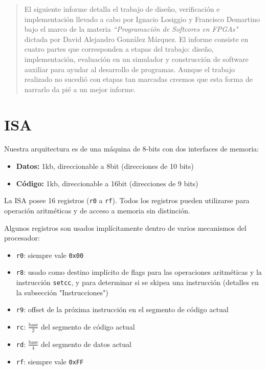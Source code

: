 \documentclass{article}
\begin{document}

\fecha{\today}



\maketitle

\begin{abstract}
El siguiente informe detalla el trabajo de diseño, verificación e implementación llevado a cabo por Ignacio Losiggio y Francisco Demartino bajo el marco de la materia \emph{``Programación de Softcores en FPGAs"} dictada por David Alejandro González Márquez. El informe consiste en cuatro partes que corresponden a etapas del trabajo: diseño, implementación, evaluación en un simulador y construcción de software auxiliar para ayudar al desarrollo de programas. Aunque el trabajo realizado no sucedió con etapas tan marcadas creemos que esta forma de narrarlo da pié a un mejor informe.
\end{abstract}

\tableofcontents

\newpage

\section{ISA}

Nuestra arquitectura es de una máquina de 8-bits con dos interfaces de memoria:
\begin{itemize}
    \item \textbf{Datos:}  1kb, direccionable a 8bit (direcciones de 10 bits)
    \item \textbf{Código:} 1kb, direccionable a 16bit (direcciones de 9 bits)
\end{itemize}

La ISA posee 16 registros (\texttt{r0} a \texttt{rf}). Todos los registros pueden utilizarse para operación aritméticas y de acceso a memoria sin distinción.

Algunos registros son usados implícitamente dentro de varios mecanismos del procesador:
\begin{itemize}
    \item \texttt{r0}: siempre vale \texttt{0x00}
    \item \texttt{r8}: usado como destino implícito de flags para las operaciones aritméticas y la instrucción \texttt{setcc}, y para determinar si se skipea una instrucción (detalles en la subsección "Instrucciones")
    \item \texttt{r9}: offset de la próxima instrucción en el segmento de código actual
    \item \texttt{rc}: $\frac{\text{base}}{2}$ del segmento de código actual
    \item \texttt{rd}: $\frac{\text{base}}{4}$ del segmento de datos actual
    \item \texttt{rf}: siempre vale \texttt{0xFF}
\end{itemize}
\end{document}
